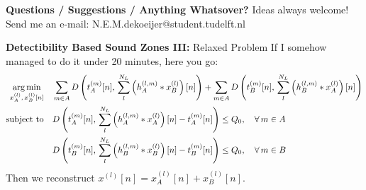\documentclass[aspectratio=169]{beamer}
\begin{document}
\begin{frame}{\textbf{Questions / Suggestions / Anything Whatsover?}}
    {\tiny \color{black} Ideas always welcome! Send me an e-mail: N.E.M.dekoeijer@student.tudelft.nl}\\
    \printbibliography
\end{frame}

\begin{frame}{\textbf{Detectibility Based Sound Zones III:} Relaxed Problem} 
    If I somehow managed to do it under 20 minutes, here you go:
    \begin{align*}
        \argmin{x_A^{(l)},\,x_B^{(l)}[n]}{
        &\sum_{m\in A} D\left(t_A^{(m)}[n],\,\sum_l^{N_L} \left(h_A^{(l,m)} \ast x_B^{(l)}\right)[n]\right) +  
         \sum_{m\in A} D\left(t_B^{(m)}[n],\,\sum_l^{N_L} \left(h_B^{(l,m)} \ast x_A^{(l)}\right)[n]\right) 
        }\\ 
    \subjectto{
        &D\left(t_A^{(m)}[n],\,\sum_l^{N_L} \left(h_A^{(l,m)} \ast x_A^{(l)}\right)[n] - t_A^{(m)}[n]\right) \leq Q_0,\quad \forall\,m\in A \\
        &D\left(t_B^{(m)}[n],\,\sum_l^{N_L} \left(h_B^{(l,m)} \ast x_B^{(l)}\right)[n] - t_B^{(m)}[n]\right) \leq Q_0,\quad \forall\,m\in B 
    }
    \end{align*}
    Then we reconstruct $x^{(l)}[n] = x_A^{(l)}[n] + x_B^{(l)}[n]$.
\end{frame}
\end{document}
